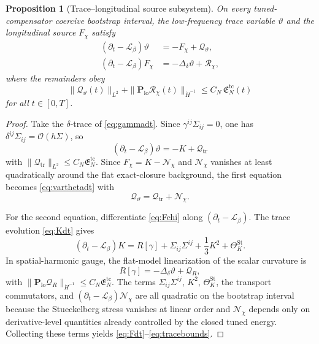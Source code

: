 \documentclass[11pt]{article}
\newcommand{\Ell}{\mathcal{L}}
\newtheorem{proposition}{Proposition}
\begin{document}
\begin{proposition}[Trace--longitudinal source subsystem]
\label{prop:trace}
On every tuned-compensator coercive bootstrap interval, the low-frequency trace variable \(\vartheta\) and the longitudinal source \(F_\chi\) satisfy
\begin{align}
(\partial_t-\Ell_\beta)\vartheta
&=
-F_\chi+\mathcal Q_\vartheta,
\label{eq:varthetadt}
\\
(\partial_t-\Ell_\beta)F_\chi
&=
-\Delta_\delta \vartheta+\mathcal R_\chi,
\label{eq:Fdt}
\end{align}
where the remainders obey
\begin{equation}
\|\mathcal Q_\vartheta(t)\|_{L^2}
+\|\mathbf P_{\mathrm{lo}}\mathcal R_\chi(t)\|_{\dot H^{-1}}
\le
C_N\,\mathfrak E_N^{\mathrm{tc}}(t)
\label{eq:tracebounds}
\end{equation}
for all \(t\in[0,T]\).
\end{proposition}

\begin{proof}
Take the \(\delta\)-trace of \eqref{eq:gammadt}. Since \(\gamma^{ij}\Sigma_{ij}=0\), one has \(\delta^{ij}\Sigma_{ij}=\mathcal O(h\Sigma)\), so
\[
(\partial_t-\Ell_\beta)\vartheta
=
-K+\mathcal Q_{\mathrm{tr}}
\]
with \(\|\mathcal Q_{\mathrm{tr}}\|_{L^2}\le C_N\mathfrak E_N^{\mathrm{tc}}\). Since \(F_\chi=K-\mathcal N_\chi\) and \(\mathcal N_\chi\) vanishes at least quadratically around the flat exact-closure background, the first equation becomes \eqref{eq:varthetadt} with
\[
\mathcal Q_\vartheta=\mathcal Q_{\mathrm{tr}}+\mathcal N_\chi.
\]

For the second equation, differentiate \eqref{eq:Fchi} along \((\partial_t-\Ell_\beta)\). The trace evolution \eqref{eq:Kdt} gives
\[
(\partial_t-\Ell_\beta)K
=
R[\gamma]+\Sigma_{ij}\Sigma^{ij}+\frac13K^2+\Theta_K^{\mathrm{St}}.
\]
In spatial-harmonic gauge, the flat-model linearization of the scalar curvature is
\[
R[\gamma]=-\Delta_\delta \vartheta+\mathcal Q_R,
\]
with \(\|\mathbf P_{\mathrm{lo}}\mathcal Q_R\|_{\dot H^{-1}}\le C_N\mathfrak E_N^{\mathrm{tc}}\). The terms \(\Sigma_{ij}\Sigma^{ij}\), \(K^2\), \(\Theta_K^{\mathrm{St}}\), the transport commutators, and \((\partial_t-\Ell_\beta)\mathcal N_\chi\) are all quadratic on the bootstrap interval because the Stueckelberg stress vanishes at linear order and \(\mathcal N_\chi\) depends only on derivative-level quantities already controlled by the closed tuned energy. Collecting these terms yields \eqref{eq:Fdt}--\eqref{eq:tracebounds}.
\end{proof}
\end{document}
